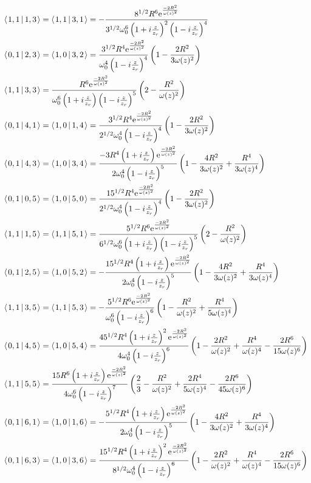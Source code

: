 \documentclass[11pt]{amsart}
\makeatletter
\newcommand{\e}{{\rm e}}				%
\newcommand{\msp}[1]{\mspace{#1mu}}		%
\newcommand{\0}{\varnothing}		%
\newcommand{\brac}[2]{\left\langle\msp{2} #1\left\lvert \msp{3.5} #2 \right.\right\rangle}	%
\newcommand{\1}{!}
\newcommand{\2}{@}
\newcommand{\3}{\#}
\newcommand{\4}{\$}
\newcommand{\5}{\%}
\newcommand{\6}{$^\wedge$}
\newcommand{\7}{\&}
\newcommand{\8}{*}
\newcommand{\9}{(}
\makeatother
\begin{document}
\begin{align*}
&
\brac{1,1}{1,3} = \brac{1,1}{3,1} = -\frac{8^{1/2}R^6\e^{\frac{-2R^2}{\omega(z)^2}}}{3^{1/2}\omega_0^6\left(1+i\frac{z}{z_r}\right)^2\left(1-i\frac{z}{z_r}\right)^4}
\\
&
\brac{0,1}{2,3} = \brac{1,0}{3,2} = \frac{3^{1/2}R^4\e^{\frac{-2R^2}{\omega(z)^2}}}{\omega_0^4\left(1-i\frac{z}{z_r}\right)^4}\left(1-\frac{2R^2}{3\omega(z)^2}\right)
\\
&
\brac{1,1}{3,3} = \frac{R^6\e^{\frac{-2R^2}{\omega(z)^2}}}{\omega_0^6\left(1+i\frac{z}{z_r}\right)\left(1-i\frac{z}{z_r}\right)^5}\left(2-\frac{R^2}{\omega(z)^2}\right)
\\
&
\brac{0,1}{4,1} = \brac{1,0}{1,4} = \frac{3^{1/2}R^4\e^{\frac{-2R^2}{\omega(z)^2}}}{2^{1/2}\omega_0^4\left(1-i\frac{z}{z_r}\right)^4}\left(1-\frac{2R^2}{3\omega(z)^2}\right)
\\
&
\brac{0,1}{4,3} = \brac{1,0}{3,4} = \frac{-3R^4\left(1+i\frac{z}{z_r}\right)\e^{\frac{-2R^2}{\omega(z)^2}}}{2\omega_0^4\left(1-i\frac{z}{z_r}\right)^5}\left(1-\frac{4R^2}{3\omega(z)^2}+\frac{R^4}{3\omega(z)^4}\right)
\\
&
\brac{0,1}{0,5} = \brac{1,0}{5,0} = \frac{15^{1/2}R^4\e^{\frac{-2R^2}{\omega(z)^2}}}{2^{1/2}\omega_0^4\left(1-i\frac{z}{z_r}\right)^4}\left(1-\frac{2R^2}{3\omega(z)^2}\right)
\\
&
\brac{1,1}{1,5} = \brac{1,1}{5,1} = \frac{5^{1/2}R^6\e^{\frac{-2R^2}{\omega(z)^2}}}{6^{1/2}\omega_0^6\left(1+i\frac{z}{z_r}\right)\left(1-i\frac{z}{z_r}\right)^5}\left(2-\frac{R^2}{\omega(z)^2}\right)
\\
&
\brac{0,1}{2,5} = \brac{1,0}{5,2} = -\frac{15^{1/2}R^4\left(1+i\frac{z}{z_r}\right)\e^{\frac{-2R^2}{\omega(z)^2}}}{2\omega_0^4\left(1-i\frac{z}{z_r}\right)^5}\left(1-\frac{4R^2}{3\omega(z)^2}+\frac{R^4}{3\omega(z)^4}\right)
\\
&
\brac{1,1}{3,5} = \brac{1,1}{5,3} = -\frac{5^{1/2}R^6\e^{\frac{-2R^2}{\omega(z)^2}}}{\omega_0^6\left(1-i\frac{z}{z_r}\right)^6}\left(1-\frac{R^2}{\omega(z)^2}+\frac{R^4}{5\omega(z)^4}\right)
\\
&
\brac{0,1}{4,5} = \brac{1,0}{5,4} = \frac{45^{1/2}R^4\left(1+i\frac{z}{z_r}\right)^2\e^{\frac{-2R^2}{\omega(z)^2}}}{4\omega_0^4\left(1-i\frac{z}{z_r}\right)^6}\left(1-\frac{2R^2}{\omega(z)^2}+\frac{R^4}{\omega(z)^4}-\frac{2R^6}{15\omega(z)^6}\right)
\\
&
\brac{1,1}{5,5} = \frac{15R^6\left(1+i\frac{z}{z_r}\right)\e^{\frac{-2R^2}{\omega(z)^2}}}{4\omega_0^6\left(1-i\frac{z}{z_r}\right)^7}\left(\frac{2}{3}-\frac{R^2}{\omega(z)^2}+\frac{2R^4}{5\omega(z)^4}-\frac{2R^6}{45\omega(z)^6}\right)
\\
&
\brac{0,1}{6,1} =\brac{1,0}{1,6} = -\frac{5^{1/2}R^4\left(1+i\frac{z}{z_r}\right)\e^{\frac{-2R^2}{\omega(z)^2}}}{2\omega_0^4\left(1-i\frac{z}{z_r}\right)^5}\left(1-\frac{4R^2}{3\omega(z)^2}+\frac{R^4}{3\omega(z)^4}\right)
\\
&
\brac{0,1}{6,3} = \brac{1,0}{3,6} = \frac{15^{1/2}R^4\left(1+i\frac{z}{z_r}\right)^2\e^{\frac{-2R^2}{\omega(z)^2}}}{8^{1/2}\omega_0^4\left(1-i\frac{z}{z_r}\right)^6}\left(1-\frac{2R^2}{\omega(z)^2}+\frac{R^4}{\omega(z)^4}-\frac{2R^6}{15\omega(z)^6}\right)
\end{align*}
\end{document}
